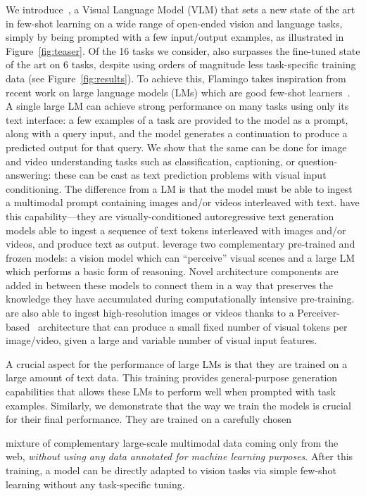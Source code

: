 We introduce~\largem, a Visual Language Model (VLM) that sets a new state of the art in few-shot learning on a wide range of open-ended vision and language tasks, simply by being prompted with a few input/output examples, as illustrated in Figure~\ref{fig:teaser}.
Of the 16 tasks we consider, \largem{} also surpasses the fine-tuned state of the art on 6 tasks, despite using orders of magnitude less task-specific training data (see Figure~\ref{fig:results}).
To achieve this, Flamingo takes inspiration from recent work on large language models (LMs) which are good few-shot learners~\citep{gpt3,gopher,chinchilla,chowdhery2022palm}.
A single large LM can
achieve strong performance on many tasks using only its text interface: a few examples of a task are provided to the model as a prompt, along with a query input, and the model generates a continuation to produce a predicted output for that query.
We show that the same can be done for image and video understanding tasks such as classification, captioning, or question-answering: these can be cast as text prediction problems with visual input conditioning.
The difference from a LM is that the model must be able to ingest a multimodal prompt containing images and/or videos interleaved with text.
\methodfamily{} have this capability---they are
visually-conditioned autoregressive text generation models able to ingest a sequence of text tokens interleaved with images and/or videos, and produce text as output.
\methodfamily{} leverage two complementary pre-trained and frozen models: a vision model which can ``perceive'' visual scenes and a large LM which performs a basic form of reasoning.
Novel architecture components are added in between these models to connect them in a way that preserves the knowledge they have accumulated during computationally intensive pre-training.
\methodfamily{} are also able to ingest high-resolution images or videos thanks to a Perceiver-based~\citep{jaegle2021perceiver} architecture that can produce a small fixed number of visual tokens per image/video, given a large and variable number of visual input features.

\parbox{\textwidth}{A crucial aspect for the performance of large LMs is that they are trained on a large amount of text data.
This training provides general-purpose generation capabilities that allows these LMs to perform well when prompted with task examples.
Similarly, we demonstrate that the way we train
the \method{} models is crucial for their final performance.
They are trained on a carefully chosen \parfillskip=0pt} \newpage mixture of complementary large-scale multimodal data coming only from the web, \emph{without using any data annotated for machine learning purposes}.
After this training,
a \method{} model can be directly adapted to vision tasks via simple few-shot learning without any
task-specific tuning.




